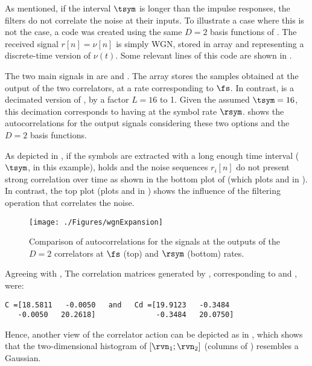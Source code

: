As mentioned, if the interval $\tsym$ is longer than the impulse responses, the filters do not correlate the noise at their inputs. 
To illustrate a case where this is not the case, a {\matlab} code was created using the same
$D=2$ basis functions of . The received signal $r[n]=\nu[n]$ is simply WGN, stored in array  and representing a discrete-time version of $\nu(t)$. Some relevant lines of this code are shown in .



The two main signals in  are 
 and . The array  stores the samples obtained at the output of the two correlators, at a rate corresponding to $\fs$. In contrast,  is a decimated version of , by a factor $L=16$ to 1. Given the assumed $\tsym=16$, this decimation corresponds to having  at the symbol rate $\rsym$.  shows the autocorrelations for the output signals considering these two options and the $D=2$ basis functions.

As depicted in , if the symbols are extracted with a long enough time interval ($\tsym$, in this example),  holds and the noise sequences $r_i[n]$ do not present strong correlation over time as shown in the bottom plot of  (which plots  and  in ). In contrast, the top plot (plots  and  in ) shows the influence of the filtering operation that correlates the noise.%

\begin{figure}
\centering
\texttt{[image: ./Figures/wgnExpansion]}
\caption{Comparison of autocorrelations for the signals at the outputs of the $D=2$ correlators at $\fs$ (top) and $\rsym$ (bottom) rates.\label{fig:wgnExpansion}}
\end{figure}

Agreeing with , The correlation matrices generated by , corresponding to  and , were:
\begin{verbatim}
C =[18.5811   -0.0050   and   Cd =[19.9123   -0.3484
   -0.0050   20.2618]              -0.3484   20.0750]
\end{verbatim}
Hence, 
another view of the correlator action can be depicted as in , 
which shows that the two-dimensional histogram of $[\rvn_1; \rvn_2]$ (columns of ) resembles a Gaussian. 

